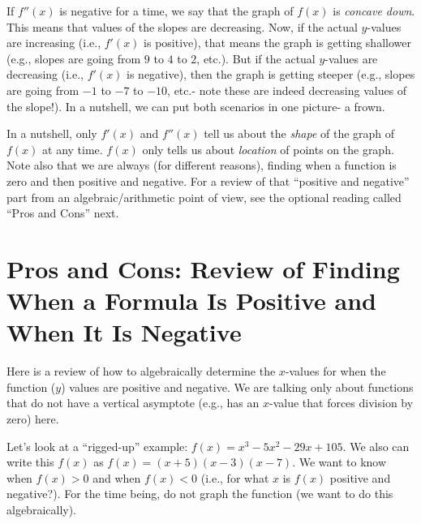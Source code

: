 \documentclass{ximera}
\begin{document}
If $f''(x)$ is negative for a time, we say that the graph of $f(x)$ is {\em concave down}.  This means that values of the slopes are decreasing.  Now, if the actual $y$-values are increasing (i.e., $f'(x)$ is positive), that means the graph is getting shallower (e.g., slopes are going from $9$ to $4$ to $2$, etc.).  But if the actual $y$-values are decreasing (i.e., $f'(x)$ is negative), then the graph is getting steeper (e.g., slopes are going from $-1$ to $-7$ to $-10$, etc.- note these are indeed decreasing values of the slope!).  In a nutshell, we can put both scenarios in one picture- a frown.

\begin{center}
\end{center}



In a nutshell, only $f'(x)$ and $f''(x)$ tell us about the {\em shape} of the graph of $f(x)$ at any time.  $f(x)$ only tells us about {\em location} of points on the graph.  Note also that we are always (for different reasons), finding when a function is zero and then positive and negative.  For a review of that ``positive and negative'' part from an algebraic/arithmetic point of view, see the optional reading called ``Pros and Cons'' next.

\section*{Pros and Cons: Review of Finding When a Formula Is Positive and When It Is Negative}

Here is a review of how to algebraically determine the $x$-values for when the function ($y$) values are positive and negative.  We are talking only about functions that do not have a vertical asymptote (e.g., has an $x$-value that forces division by zero) here.

Let's look at a ``rigged-up'' example: $f(x) = x^3-5x^2-29x+105$.  We also can write this $ f(x)$ as $f(x) = (x+5)(x-3)(x-7)$.  We want to know when $f(x) > 0$ and when $f(x) < 0$ (i.e., for what $x$ is $f(x)$ positive and negative?). For the time being, do not graph the function (we want to do this algebraically).
\end{document}

